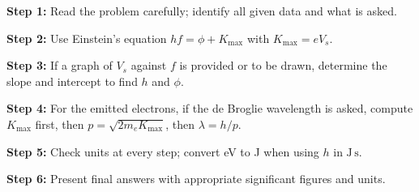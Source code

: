 \documentclass[11pt]{article}
\begin{document}
\begin{methode}
\textbf{Step 1:} Read the problem carefully; identify all given data and what is asked.\par
\textbf{Step 2:} Use Einstein's equation $hf = \phi + K_{\max}$ with $K_{\max} = eV_s$.\par
\textbf{Step 3:} If a graph of $V_s$ against $f$ is provided or to be drawn, determine the slope and intercept to find $h$ and $\phi$.\par
\textbf{Step 4:} For the emitted electrons, if the de Broglie wavelength is asked, compute $K_{\max}$ first, then $p = \sqrt{2m_e K_{\max}}$, then $\lambda = h/p$.\par
\textbf{Step 5:} Check units at every step; convert eV to J when using $h$ in $\mathrm{J\,s}$.\par
\textbf{Step 6:} Present final answers with appropriate significant figures and units.
\end{methode}
\end{document}
